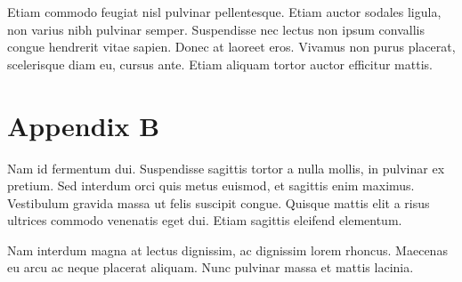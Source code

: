 \documentclass[sigconf]{acmart}
\begin{document}
Etiam commodo feugiat nisl pulvinar pellentesque. Etiam auctor sodales
ligula, non varius nibh pulvinar semper. Suspendisse nec lectus non
ipsum convallis congue hendrerit vitae sapien. Donec at laoreet
eros. Vivamus non purus placerat, scelerisque diam eu, cursus
ante. Etiam aliquam tortor auctor efficitur mattis.

\section{Appendix B}

Nam id fermentum dui. Suspendisse sagittis tortor a nulla mollis, in
pulvinar ex pretium. Sed interdum orci quis metus euismod, et sagittis
enim maximus. Vestibulum gravida massa ut felis suscipit
congue. Quisque mattis elit a risus ultrices commodo venenatis eget
dui. Etiam sagittis eleifend elementum.

Nam interdum magna at lectus dignissim, ac dignissim lorem
rhoncus. Maecenas eu arcu ac neque placerat aliquam. Nunc pulvinar
massa et mattis lacinia.
\end{document}
